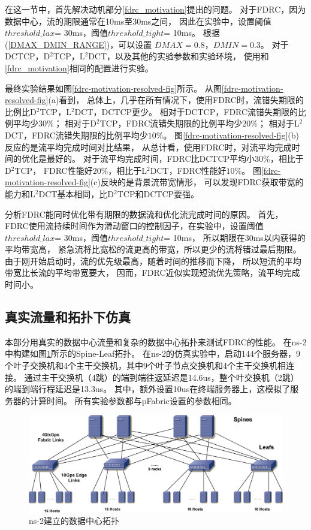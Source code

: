 在这一节中，首先解决动机部分\ref{fdrc_motivation}提出的问题。
对于FDRC，因为数据中心，流的期限通常在10ms至30ms之间，
因此在实验中，设置阈值$threshold\_lax$= 30ms，阈值$threshold\_tight$= 10ms。 
根据(\ref{DMAX_DMIN_RANGE})，可以设置 $DMAX = 0.8$，$DMIN = 0.3$。
对于DCTCP，D$^2$TCP，L$^2$DCT，以及其他的实验参数和实验环境，
使用和\ref{fdrc_motivation}相同的配置进行实验。


最终实验结果如图\ref{fdrc-motivation-resolved-fig}所示。
从图\ref{fdrc-motivation-resolved-fig}(a)看到，
总体上，几乎在所有情况下，使用FDRC时，流错失期限的比例比D$^2$TCP，L$^2$DCT，DCTCP更少。
相对于DCTCP，FDRC流错失期限的比例平均少$30\%$；
相对于D$^2$TCP，FDRC流错失期限的比例平均少$20\%$；
相对于L$^2$DCT，FDRC流错失期限的比例平均少$10\%$。
图\ref{fdrc-motivation-resolved-fig}(b)反应的是流平均完成时间对比结果，
从总计看，使用FDRC时，对流平均完成时间的优化是最好的。
对于流平均完成时间，FDRC比DCTCP平均小$30\%$，相比于D$^2$TCP，
FDRC性能好$20\%$，相比于L$^2$DCT，FDRC性能好$10\%$。
图\ref{fdrc-motivation-resolved-fig}(c)反映的是背景流带宽情形，
可以发现FDRC获取带宽的能力和L$^2$DCT基本相同，比D$^2$TCP和DCTCP要强。

分析FDRC能同时优化带有期限的数据流和优化流完成时间的原因。
首先，FDRC使用流持续时间作为滑动窗口的控制因子，在实验中，设置阈值$threshold\_lax$= 30ms，阈值$threshold\_tight$= 10ms，
所以期限在30ms以内获得的平均带宽高，
紧急流将比宽松的流更高的带宽，所以更少的流将错过最后期限。
由于刚开始启动时，流的优先级最高，随着时间的推移而下降，
所以短流的平均带宽比长流的平均带宽要大，
因而，FDRC近似实现短流优先策略，流平均完成时间小。

\subsection{真实流量和拓扑下仿真}

本部分用真实的数据中心流量和复杂的数据中心拓扑来测试FDRC的性能。
在ns-2中构建如图\ref{FDRC-DataCenterTop-fig}所示的Spine-Leaf拓扑。
在ns-2的仿真实验中，启动144个服务器，9个叶子交换机和4个主干交换机，其中9个叶子节点交换机和4个主干交换机相连接。
通过主干交换机（4跳）的端到端往返延迟是14.6us，整个叶交换机（2跳）的端到端行程延迟是13.3us。
其中，额外设置10us在终端服务器上，这模拟了服务器的计算时间。
所有实验参数都与pFabric\cite{pFabric}设置的参数相同。


\begin{figure}[H] 
  \centering
  \includegraphics[width=0.8\columnwidth]{figures/FDRC/evaluation/spineleaf/spineleaf.eps}
  \caption{ns-2建立的数据中心拓扑}
\label{FDRC-DataCenterTop-fig}
\end{figure}

